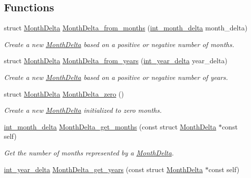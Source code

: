 \subsection*{\-Functions}
\begin{DoxyCompactItemize}
\item 
struct \hyperlink{structMonthDelta}{\-Month\-Delta} \hyperlink{month-delta_8h_ab2435ae92655bed23406d37b4b8f4750}{\-Month\-Delta\-\_\-from\-\_\-months} (\hyperlink{types_8h_afc803698820c39aa1ed3694de502a591}{int\-\_\-month\-\_\-delta} month\-\_\-delta)
\begin{DoxyCompactList}\small\item\em \-Create a new \hyperlink{structMonthDelta}{\-Month\-Delta} based on a positive or negative number of months. \end{DoxyCompactList}\item 
struct \hyperlink{structMonthDelta}{\-Month\-Delta} \hyperlink{month-delta_8h_aec5607ad9e7e090c39b2f50a68974ef0}{\-Month\-Delta\-\_\-from\-\_\-years} (\hyperlink{types_8h_a6a5c8fde0b5ed80727db4db4bdd2173d}{int\-\_\-year\-\_\-delta} year\-\_\-delta)
\begin{DoxyCompactList}\small\item\em \-Create a new \hyperlink{structMonthDelta}{\-Month\-Delta} based on a positive or negative number of years. \end{DoxyCompactList}\item 
struct \hyperlink{structMonthDelta}{\-Month\-Delta} \hyperlink{month-delta_8h_aca81ef97d8ec1cd052ab391636f16bf7}{\-Month\-Delta\-\_\-zero} ()
\begin{DoxyCompactList}\small\item\em \-Create a new \hyperlink{structMonthDelta}{\-Month\-Delta} initialized to zero months. \end{DoxyCompactList}\item 
\hyperlink{types_8h_afc803698820c39aa1ed3694de502a591}{int\-\_\-month\-\_\-delta} \hyperlink{month-delta_8h_aa01811194746354457e2b5e7a70dd59d}{\-Month\-Delta\-\_\-get\-\_\-months} (const struct \hyperlink{structMonthDelta}{\-Month\-Delta} $\ast$const self)
\begin{DoxyCompactList}\small\item\em \-Get the number of months represented by a \hyperlink{structMonthDelta}{\-Month\-Delta}. \end{DoxyCompactList}\item 
\hyperlink{types_8h_a6a5c8fde0b5ed80727db4db4bdd2173d}{int\-\_\-year\-\_\-delta} \hyperlink{month-delta_8h_a37279655ebb7be159cdf2fcfbf460348}{\-Month\-Delta\-\_\-get\-\_\-years} (const struct \hyperlink{structMonthDelta}{\-Month\-Delta} $\ast$const self)

\end{DoxyCompactItemize}
